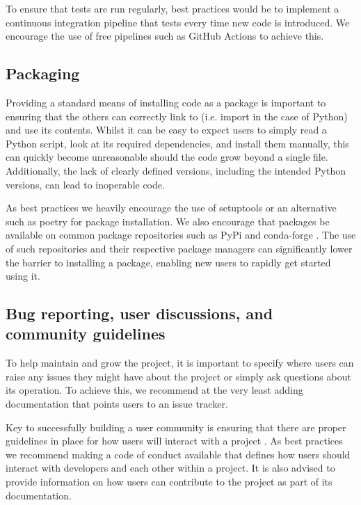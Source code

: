 \documentclass[9pt,whitepaper]{livecoms}
\begin{document}
To ensure that tests are run regularly, best practices would be to implement a continuous integration pipeline that tests every time new code is introduced. We encourage the use of free pipelines such as GitHub Actions \cite{github_inc_github_2022-2} to achieve this.

\subsection{Packaging}
\label{sec:packaging}

Providing a standard means of installing code as a package is important to ensuring that the others can correctly link to (i.e. import in the case of Python) and use its contents. Whilst it can be easy to expect users to simply read a Python script, look at its required dependencies, and install them manually, this can quickly become unreasonable should the code grow beyond a single file. Additionally, the lack of clearly defined versions, including the intended Python versions, can lead to inoperable code.

As best practices we heavily encourage the use of setuptools \cite{noauthor_pypasetuptools_2022} or an alternative such as poetry \cite{noauthor_poetry_nodate} for package installation. We also encourage that packages be available on common package repositories such as PyPi \cite{noauthor_pypi_nodate} and conda-forge \cite{conda-forge_community_conda-forge_2015}. The use of such repositories and their respective package managers can significantly lower the barrier to installing a package, enabling new users to rapidly get started using it.

\subsection{Bug reporting, user discussions, and community guidelines}
\label{sec:community}

To help maintain and grow the project, it is important to specify where users can raise any issues they might have about the project or simply ask questions about its operation. To achieve this, we recommend at the very least adding documentation that points users to an issue tracker.

Key to successfully building a user community is ensuring that there are proper guidelines in place for how users will interact with a project \cite{grossfield_how_2021}. As best practices we recommend making a code of conduct available that defines how users should interact with developers and each other within a project. It is also advised to provide information on how users can contribute to the project as part of its documentation.
\end{document}
